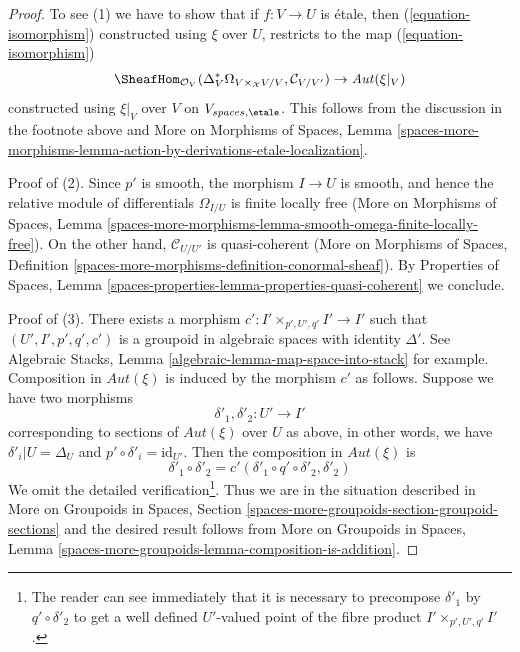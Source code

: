\begin{proof}
\medskip\noindent
To see (1) we have to show that if $f : V \to U$ is \'etale,
then (\ref{equation-isomorphism}) constructed using $\xi$ over $U$,
restricts to the map (\ref{equation-isomorphism})
$$
\SheafHom_{\mathcal{O}_V}(
\Delta_V^*\Omega_{V \times_\mathcal{X} V/V}, \mathcal{C}_{V/V'}) \to
\mathit{Aut}(\xi|_V)
$$
constructed using $\xi|_V$ over $V$ on $V_{spaces, \etale}$.
This follows from the discussion in the footnote above
and More on Morphisms of Spaces, Lemma
\ref{spaces-more-morphisms-lemma-action-by-derivations-etale-localization}.

\medskip\noindent
Proof of (2). Since $p'$ is smooth, the morphism $I \to U$ is smooth,
and hence the relative module of differentials $\Omega_{I/U}$
is finite locally free (More on Morphisms of Spaces, Lemma
\ref{spaces-more-morphisms-lemma-smooth-omega-finite-locally-free}).
On the other hand, $\mathcal{C}_{U/U'}$ is quasi-coherent
(More on Morphisms of Spaces, Definition
\ref{spaces-more-morphisms-definition-conormal-sheaf}).
By Properties of Spaces, Lemma
\ref{spaces-properties-lemma-properties-quasi-coherent}
we conclude.

\medskip\noindent
Proof of (3). There exists a morphism $c' : I' \times_{p', U', q'} I' \to I'$
such that $(U', I', p', q', c')$ is a groupoid in algebraic spaces
with identity $\Delta'$. See
Algebraic Stacks, Lemma \ref{algebraic-lemma-map-space-into-stack} for example.
Composition in $\mathit{Aut}(\xi)$ is induced by the morphism
$c'$ as follows. Suppose we have two morphisms
$$
\delta'_1, \delta'_2 : U' \longrightarrow I'
$$
corresponding to sections of $\mathit{Aut}(\xi)$ over $U$ as above,
in other words, we have $\delta'_i|U = \Delta_U$ and
$p' \circ \delta'_i = \text{id}_{U'}$. Then the composition
in $\mathit{Aut}(\xi)$ is
$$
\delta'_1 \circ \delta'_2 = c'(\delta'_1 \circ q' \circ \delta'_2, \delta'_2)
$$
We omit the detailed verification\footnote{The reader can see immediately
that it is necessary to precompose
$\delta'_1$ by $q' \circ \delta'_2$ to get a well defined $U'$-valued
point of the fibre product $I' \times_{p', U', q'} I'$.}.
Thus we are in the situation described in
More on Groupoids in Spaces, Section
\ref{spaces-more-groupoids-section-groupoid-sections}
and the desired result follows from
More on Groupoids in Spaces, Lemma
\ref{spaces-more-groupoids-lemma-composition-is-addition}.
\end{proof}
